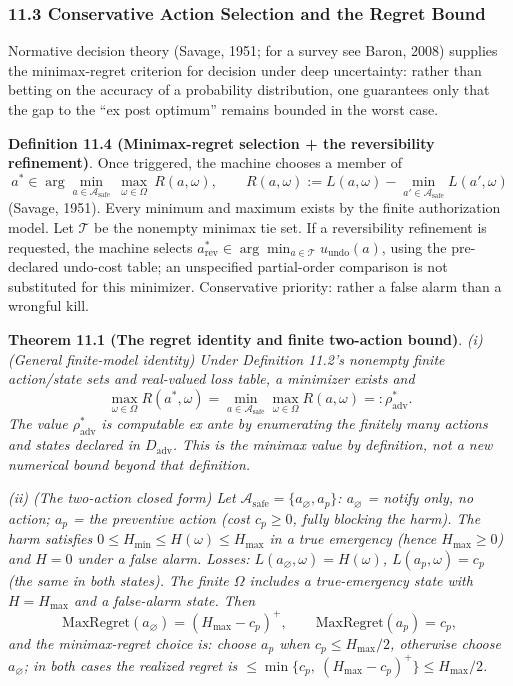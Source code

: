 \documentclass[
  11pt]{article}
\begin{document}
\subsubsection{11.3 Conservative Action Selection and the Regret
Bound}\label{conservative-action-selection-and-the-regret-bound}

Normative decision theory (Savage, 1951; for a survey see Baron, 2008)
supplies the minimax-regret criterion for decision under deep
uncertainty: rather than betting on the accuracy of a probability
distribution, one guarantees only that the gap to the ``ex post
optimum'' remains bounded in the worst case.

\textbf{Definition 11.4 (Minimax-regret selection + the reversibility
refinement)}. Once triggered, the machine chooses a member of
\[a^* \in \arg\min_{a \in \mathcal{A}_{\mathrm{safe}}}\ \max_{\omega \in \Omega}\ R(a, \omega), \qquad R(a,\omega) := L(a,\omega) - \min_{a' \in \mathcal{A}_{\mathrm{safe}}} L(a',\omega)\]
(Savage, 1951). Every minimum and maximum exists by the finite
authorization model. Let \(\mathcal T\) be the nonempty minimax tie set.
If a reversibility refinement is requested, the machine selects
\(a_{\mathrm{rev}}^*\in\arg\min_{a\in\mathcal T}u_{\mathrm{undo}}(a)\),
using the pre-declared undo-cost table; an unspecified partial-order
comparison is not substituted for this minimizer. Conservative priority:
rather a false alarm than a wrongful kill.

\textbf{Theorem 11.1 (The regret identity and finite two-action bound)}.
\emph{(i) (General finite-model identity) Under Definition 11.2's
nonempty finite action/state sets and real-valued loss table, a
minimizer exists and}
\[\max_{\omega\in\Omega} R(a^*, \omega) = \min_{a \in \mathcal{A}_{\mathrm{safe}}} \max_{\omega\in\Omega} R(a,\omega)=:\rho_{\mathrm{adv}}^*.\]
\emph{The value \(\rho_{\mathrm{adv}}^*\) is computable ex ante by
enumerating the finitely many actions and states declared in
\(D_{\mathrm{adv}}\). This is the minimax value by definition, not a new
numerical bound beyond that definition.}

\emph{(ii) (The two-action closed form) Let
\(\mathcal{A}_{\mathrm{safe}} = \{a_\varnothing, a_p\}\):
\(a_\varnothing\) = notify only, no action; \(a_p\) = the preventive
action (cost \(c_p\ge0\), fully blocking the harm). The harm satisfies
\(0\le H_{\min}\le H(\omega)\le H_{\max}\) in a true emergency (hence
\(H_{\max}\ge0\)) and \(H = 0\) under a false alarm. Losses:
\(L(a_\varnothing, \omega) = H(\omega)\), \(L(a_p, \omega) = c_p\) (the
same in both states). The finite \(\Omega\) includes a true-emergency
state with \(H=H_{\max}\) and a false-alarm state. Then}
\[\mathrm{MaxRegret}(a_\varnothing) = (H_{\max} - c_p)^+, \qquad \mathrm{MaxRegret}(a_p) = c_p,\]
\emph{and the minimax-regret choice is: choose \(a_p\) when
\(c_p \le H_{\max}/2\), otherwise choose \(a_\varnothing\); in both
cases the realized regret is
\(\le \min\{c_p,\ (H_{\max}-c_p)^+\} \le H_{\max}/2\).}
\end{document}
